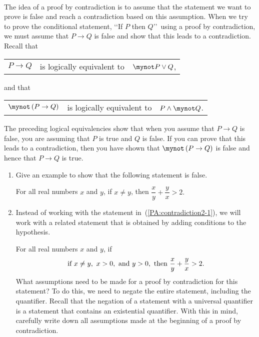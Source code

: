 \hbreak
%
\begin{previewactivity}\label{PA:contradiction2} \hfill \\
The idea of a proof by contradiction is to assume that the statement we want to prove is false and reach a contradiction based on this assumption.  When we try to prove  the conditional statement, \lq\lq If $P$ then $Q$\rq\rq~using a proof by contradiction, we must assume that  $P \to Q$ is false and show that this leads to a contradiction.  Recall that
\begin{center}
\begin{tabular}{r  l  l}
  $P \to Q$  &  is logically equivalent to  &  $\mynot  P \vee Q$, \\
\end{tabular}
\end{center}
and that
\begin{center}
\begin{tabular}{r  l  l}
  $\mynot  \left( {P \to Q} \right)$ &  is logically equivalent to  &  $P \wedge \mynot  Q$. \\
\end{tabular}
\end{center}
The preceding logical equivalencies show that when you assume that  \mbox{$P \to Q$} is false, you are assuming that  $P$  is true and  $Q$  is false.  If you can prove that this leads to a contradiction, then you have shown that $\mynot  \left( {P \to Q} \right)$ is false and hence that  $P \to Q$ is true.
\begin{enumerate}
\item Give an example to show that the following statement is false.
\label{PA:contradiction2-1}%
  \begin{center}
   For all real numbers  $x$  and  $y$, if  $x \ne y$, then  $\dfrac{x}{y} + \dfrac{y}{x} > 2.$
  \end{center}
\item Instead of working with the statement in~(\ref{PA:contradiction2-1}), we will work with a related statement that is obtained by adding conditions to the hypothesis.

For all real numbers  $x$  and  $y$, if  
\[
  \text{if } x \ne y,\textnormal{ } x > 0, \text{ and }y > 0, \text{ then } \frac{x}{y} + \frac{y}{x} > 2.
\]
What assumptions need to be made for a proof by contradiction for this statement?  To do this, we need to negate the entire statement, including the quantifier.  Recall that the negation of a statement with a universal quantifier is a statement that contains an existential quantifier.  With this in mind, carefully write down all assumptions made at the beginning of a proof by contradiction.
\end{enumerate}
\end{previewactivity}
